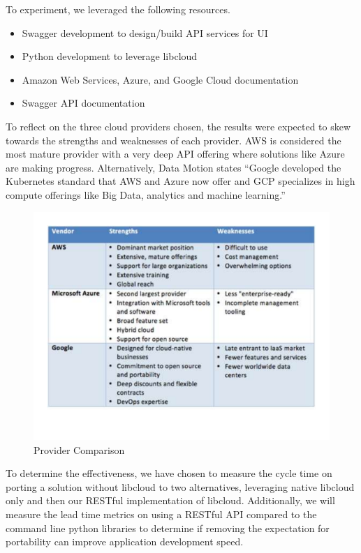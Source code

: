 To experiment, we leveraged the following resources.

\begin{itemize}

\item Swagger development to design/build API services for UI
\item Python development to leverage libcloud
\item Amazon Web Services, Azure, and Google Cloud documentation
\item Swagger API documentation
 
\end{itemize}


To reflect on the three cloud providers chosen, the results were expected to
skew towards the strengths and weaknesses of each provider. AWS is considered
the most mature provider with a very deep API offering where solutions like
Azure are making progress. Alternatively, Data Motion states ``Google developed
the Kubernetes standard that AWS and Azure now offer and GCP specializes in
high
compute offerings like Big Data, analytics and machine
learning.''\cite{hid-sp18-518-DataMotion}

\begin{figure}[!ht]
  \centering
  \includegraphics[width=\columnwidth]{images/aws-azure-google.pdf}
  \caption{Provider Comparison}\label{F:comparison}
\end{figure}

To determine the effectiveness, we have chosen to measure the cycle time on
porting a solution without libcloud to two alternatives, leveraging native
libcloud only and then our RESTful implementation of libcloud. Additionally, we
will measure the lead time metrics on using a RESTful API compared to the
command line python libraries to determine if removing the expectation for
portability can improve application development speed.

